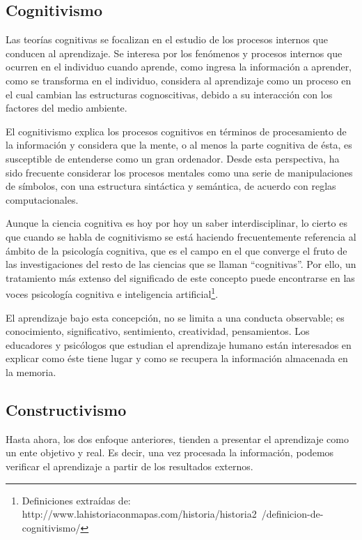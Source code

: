 \subsection{Cognitivismo}

Las teorías cognitivas se focalizan en el estudio de los procesos internos que
conducen al aprendizaje. Se interesa por los fenómenos y procesos internos que
ocurren en el individuo cuando aprende, como ingresa la información a aprender,
como se transforma en el individuo, considera al aprendizaje como un proceso en
el cual cambian las estructuras cognoscitivas, debido a su interacción con los
factores del medio ambiente.

El cognitivismo explica los procesos cognitivos en términos de procesamiento de
la información y considera que la mente, o al menos la parte cognitiva de ésta,
es susceptible de entenderse como un gran ordenador. Desde esta perspectiva, ha
sido frecuente considerar los procesos mentales como una serie de manipulaciones
de símbolos, con una estructura sintáctica y semántica, de acuerdo con reglas
computacionales.

Aunque la ciencia cognitiva es hoy por hoy un saber interdisciplinar, lo cierto
es que cuando se habla de cognitivismo se está haciendo frecuentemente
referencia al ámbito de la psicología cognitiva, que es el campo en el que
converge el fruto de las investigaciones del resto de las ciencias que se llaman
“cognitivas”. Por ello, un tratamiento más extenso del significado de este
concepto puede encontrarse en las voces psicología cognitiva e inteligencia
artificial\footnote{Definiciones extraídas de:
http://www.lahistoriaconmapas.com/historia/historia2\
/definicion-de-cognitivismo/}.

El aprendizaje bajo esta concepción, no se limita a una conducta observable; es
conocimiento, significativo, sentimiento, creatividad, pensamientos. Los
educadores y psicólogos que estudian el aprendizaje humano están interesados en
explicar como éste tiene lugar y como se recupera la información almacenada en
la memoria\cite{Rojas}.

\subsection{Constructivismo}

Hasta ahora, los dos enfoque anteriores, tienden a presentar el aprendizaje como
un ente objetivo y real. Es decir, una vez procesada la información, podemos
verificar el aprendizaje a partir de los resultados externos.

